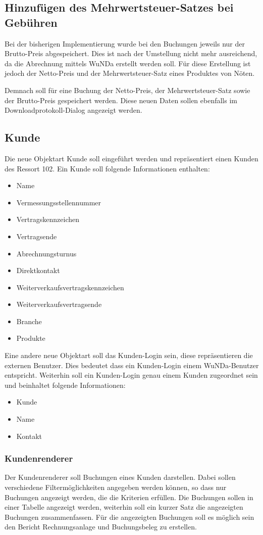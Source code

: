 \subsection{Hinzufügen des Mehrwertsteuer-Satzes bei Gebühren}
Bei der bisherigen Implementierung wurde bei den Buchungen jeweils nur der Brutto-Preis abgespeichert. Dies ist nach der Umstellung nicht mehr ausreichend, da die Abrechnung mittels \ac{WuNDa} erstellt werden soll. Für diese Erstellung ist jedoch der Netto-Preis und der Mehrwertsteuer-Satz eines Produktes von Nöten.

Demnach soll für eine Buchung der Netto-Preis, der Mehrwertsteuer-Satz sowie der Brutto-Preis gespeichert werden. Diese neuen Daten sollen ebenfalls im Downloadprotokoll-Dialog angezeigt werden. 
\subsection{Kunde}
Die neue Objektart Kunde soll eingeführt werden und repräsentiert einen Kunden des Ressort 102.
Ein Kunde soll folgende Informationen enthalten: 
\begin{itemize}
\item Name
\item Vermessungsstellennummer
\item Vertragskennzeichen
\item Vertragsende
\item Abrechnungsturnus
\item Direktkontakt
\item Weiterverkaufsvertragskennzeichen
\item Weiterverkaufsvertragsende
\item Branche
\item Produkte
\end{itemize}
Eine andere neue Objektart soll das Kunden-Login sein, diese repräsentieren die externen Benutzer.
Dies bedeutet dass ein Kunden-Login einem \ac{WuNDa}-Benutzer entspricht.
Weiterhin soll ein Kunden-Login genau einem Kunden zugeordnet sein und beinhaltet folgende Informationen: 
\begin{itemize}
\item Kunde
\item Name
\item Kontakt
\end{itemize}
\subsubsection{Kundenrenderer}
Der Kundenrenderer soll Buchungen eines Kunden darstellen.
Dabei sollen verschiedene Filtermöglichkeiten angegeben werden können, so dass nur Buchungen angezeigt werden, die die Kriterien erfüllen.
Die Buchungen sollen in einer Tabelle angezeigt werden, weiterhin soll ein kurzer Satz die angezeigten Buchungen zusammenfassen.
Für die angezeigten Buchungen soll es möglich sein den Bericht Rechnungsanlage und Buchungsbeleg zu erstellen.

